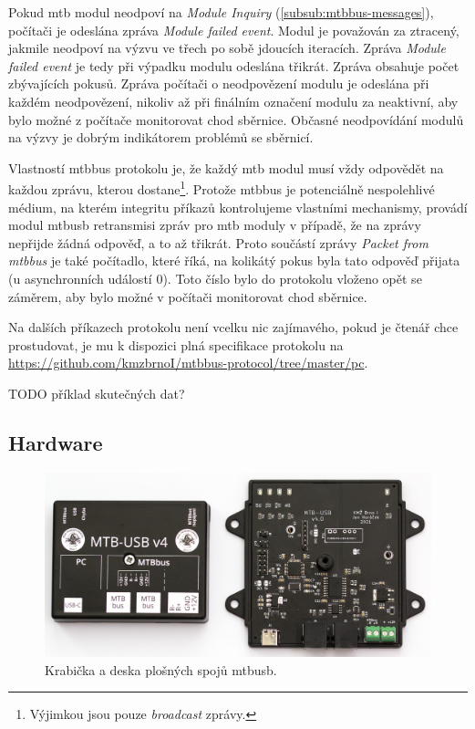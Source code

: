Pokud \gls{mtb} modul neodpoví na \textit{Module Inquiry}
(\ref{subsub:mtbbus-messages}), počítači je odeslána zpráva \textit{Module
failed event}. Modul je považován za ztracený, jakmile neodpoví na výzvu
ve třech po sobě jdoucích iteracích. Zpráva \textit{Module failed event}
je tedy při výpadku modulu odeslána třikrát. Zpráva obsahuje počet zbývajících
pokusů. Zpráva počítači o neodpovězení modulu je odeslána při každém neodpovězení,
nikoliv až při finálním označení modulu za neaktivní, aby bylo možné z počítače
monitorovat chod sběrnice. Občasné neodpovídání modulů na výzvy je dobrým
indikátorem problémů se sběrnicí.

Vlastností \gls{mtbbus} protokolu je, že každý \gls{mtb} modul musí vždy
odpovědět na každou zprávu, kterou dostane\footnote{Výjimkou jsou pouze
\textit{broadcast} zprávy.}. Protože \gls{mtbbus} je potenciálně nespolehlivé
médium, na kterém integritu příkazů kontrolujeme vlastními mechanismy, provádí
modul \gls{mtbusb} retransmisi zpráv pro \gls{mtb} moduly v případě, že na zprávy
nepřijde žádná odpověď, a to až třikrát. Proto součástí zprávy \textit{Packet
from \gls{mtbbus}} je také počítadlo, které říká, na kolikátý pokus byla tato
odpověď přijata (u asynchronních událostí 0). Toto číslo bylo do protokolu
vloženo opět se záměrem, aby bylo možné v počítači monitorovat chod sběrnice.

Na dalších příkazech protokolu není vcelku nic zajímavého, pokud je čtenář chce
prostudovat, je mu k dispozici plná specifikace protokolu na
\url{https://github.com/kmzbrnoI/mtbbus-protocol/tree/master/pc}.

TODO příklad skutečných dat?

\subsection{Hardware}

\begin{figure}[ht]
\includegraphics[width=\textwidth]{data/usb-inside.jpg}
\caption{Krabička a deska plošných spojů \gls{mtbusb}.}
\label{fig:mtbusb-prototype}
\end{figure}

